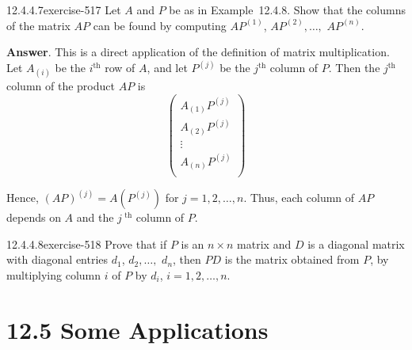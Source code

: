 \documentclass[twoside,10pt,]{book}
\numberwithin{equation}{section}
\begin{document}
\begin{divisionsolution}{12.4.4.7}{}{exercise-517}%
\hypertarget{p-4654}{}%
Let \(A\) and \(P\) be as in Example~12.4.8. Show that the columns of the matrix \(A P\) can be found by computing \(A P^{(1)}\), \(A P^{(2)},\ldots,\) \(A P^{(n)}\).%
\par\smallskip%
\noindent\textbf{Answer}.\quad%
\hypertarget{p-4655}{}%
This is a direct application of the definition of matrix multiplication. Let \(A_{(i)}\) be the \(i^{\textrm{th}}\) row of \(A\), and let \(P^{(j)}\) be the \(j^{\textrm{th}}\) column of  \(P\).  Then the \(j^{\textrm{th}}\) column of the product \(A P\) is%
\begin{equation*}
\left(
\begin{array}{c}
A_{(1)}P^{(j)} \\
A_{(2)}P^{(j)} \\
\vdots  \\
A_{(n)}P^{(j)} \\
\end{array}
\right)
\end{equation*}
%
\par
\hypertarget{p-4656}{}%
Hence, \((AP)^{(j)}= A\left(P^{(j)}\right)\)  for \(j =1,2,\ldots , n\). Thus, each column of \(A P\) depends on \(A\) and the \(j^{\textrm{ th}}\) column of \(P\).%
\end{divisionsolution}%
\begin{divisionsolution}{12.4.4.8}{}{exercise-518}%
\hypertarget{p-4657}{}%
Prove that if \(P\) is an \(n\times n\) matrix and \(D\) is a diagonal matrix with diagonal entries \(d_1\), \(d_2,\ldots,\) \(d_n\), then \(P D\) is the matrix obtained from \(P\), by multiplying column \(i\) of \(P\) by \(d_i\), \(i = 1, 2, \ldots, n\).%
\end{divisionsolution}%
\section*{12.5 Some Applications}
\end{document}
